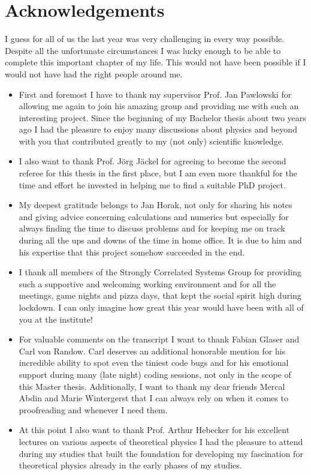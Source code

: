 \thispagestyle{plain}
\makeatletter
\section*{Acknowledgements}
I guess for all of us the last year was very challenging in every way possible. Despite all the unfortunate circumstances I was lucky enough to be able to complete this important chapter of my life. This would not have been possible if I would not have had the right people around me. 
\begin{itemize}
	\item First and foremost I have to thank my supervisor Prof. Jan Pawlowski for allowing me again to join his amazing group and providing me with such an interesting project. Since the beginning of my Bachelor thesis about two years ago I had the pleasure to enjoy many discussions about physics and beyond with you that contributed greatly to my (not only) scientific knowledge.
	\item I also want to thank Prof. J\"org J\"ackel for agreeing to become the second referee for this thesis in the first place, but I am even more thankful for the time and effort he invested in helping me to find a suitable PhD project.
	\item My deepest gratitude belongs to  Jan Horak, not only for sharing his notes and giving advice concerning calculations and numerics but especially for always finding the time to discuss problems and for keeping me on track during all the ups and downs of the time in home office. It is due to him and his expertise that this project somehow succeeded in the end.
	\item I thank all members of the Strongly Correlated Systems Group for providing such a supportive and welcoming working environment and for all the meetings, game nights and pizza days, that kept the social spirit high during lockdown. I can only imagine how great this year would have been with all of you at the institute!
	\item For valuable comments on the transcript I want to thank  Fabian Glaser and Carl von Randow. Carl deserves an additional honorable mention for his incredible ability to spot even the tiniest code bugs and for his emotional support during many (late night) coding sessions, not only in the scope of this Master thesis. Additionally, I want to thank my dear friends Mercal Abdin and Marie Wintergerst that I can always rely on when it comes to proofreading and whenever I need them.	
	\item At this point I also want to thank Prof. Arthur Hebecker for his excellent lectures on various aspects of theoretical physics I had the pleasure to attend during my studies that built the foundation for developing my fascination for theoretical physics already in the early phases of my studies.

\end{itemize}
